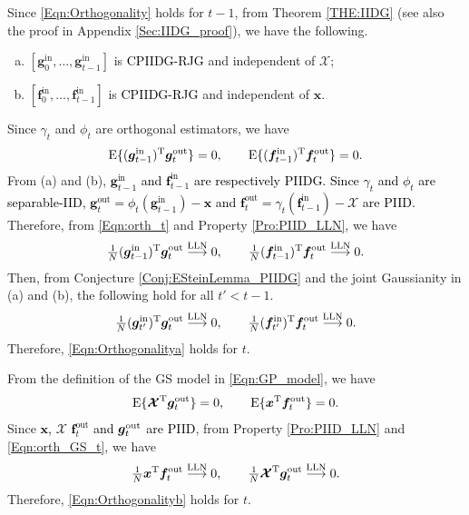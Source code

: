 \documentclass[journal]{IEEEtran}
\newcommand{\mr}{\mathrm}
\renewcommand{\bf}{\bm}
\newcommand{\LLC}[1]{\textcolor{black}{#1}}%
\begin{document}
        Since \eqref{Eqn:Orthogonality} holds for $t-1$, from Theorem \ref{THE:IIDG} (see also the proof in Appendix \ref{Sec:IIDG_proof}), we have the following.
    \begin{enumerate}[(a)] 
     \item  $\left[\bf{g}_0^{\mr{in}},\dots,\bf{g}_{t-1}^{\mr{in}}\right]$ is \LLC{CPIIDG-RJG} and independent of  $\bf{\mathcal{X}}$;
    \item   $\left[\bf{f}_0^{\mr{in}},\dots,\bf{f}_{t-1}^{\mr{in}}\right]$ is \LLC{CPIIDG-RJG} and independent of $\bf{x}$. 
\end{enumerate} 
    Since $\gamma_{t}$ and $\phi_{t}$ are orthogonal estimators, we have
    \begin{align}\label{Eqn:orth_t}
        {\rm E}\{(\bf{g}_{t-1}^{\rm in})^{\rm T}\bf{g}_t^{\rm out}\} =0,\qquad
          {\rm E}\{(\bf{f}_{t-1}^{\rm in})^{\rm T}\bf{f}_t^{\rm out}\} =0.
    \end{align}  
     From  (a) and (b), \LLC{$\bf{g}^{\mr{in}}_{t-1}$ and $\bf{f}^{\mr{in}}_{t-1}$ are respectively PIIDG. Since $\gamma_{t}$ and $\phi_{t}$ are separable-IID, $\bf{g}^{\mr{out}}_{t} = \phi_t(\bf{g}^{\mr{in}}_{t-1} )-\bf{x}$ and $\bf{f}^{\mr{out}}_{t} = \gamma_t(\bf{f}^{\mr{in}}_{t-1} )-\bf{\mathcal{X}}$ are PIID.} Therefore, from \eqref{Eqn:orth_t} and Property \ref{Pro:PIID_LLN}, we have
   \begin{align}\label{Eqn:t_1_orth_t}
        \tfrac{1}{N}(\bf{g}_{t-1}^{\rm in})^{\rm T}\bf{g}_t^{\rm out}    \overset{\rm LLN}{\longrightarrow}  {0},  \qquad 
        \tfrac{1}{N}(\bf{f}_{t-1}^{\rm in})^{\rm T}\bf{f}_t^{\rm out}  \overset{\rm LLN}{\longrightarrow}  {0}.
    \end{align} 
    Then, from Conjecture \ref{Conj:ESteinLemma_PIIDG} and the joint Gaussianity in (a) and (b), the following hold for all $t'<t-1$.   
     \begin{align} \label{Eqn:pre_orth_t}
        \tfrac{1}{N}(\bf{g}_{t'}^{\rm in})^{\rm T}\bf{g}_t^{\rm out}    \overset{\rm LLN}{\longrightarrow}  {0},   \qquad
        \tfrac{1}{N}(\bf{f}_{t'}^{\rm in})^{\rm T}\bf{f}_t^{\rm out}  \overset{\rm LLN}{\longrightarrow}  {0}.
    \end{align} 
    Therefore, \eqref{Eqn:Orthogonalitya} holds for $t$. 
    
    From the definition of the GS model in \eqref{Eqn:GP_model}, we have 
    \begin{align}\label{Eqn:orth_GS_t}
        {\rm E}\{\bf{\mathcal{X}}^{\rm T}\bf{g}_t^{\rm out}\} =0, \qquad
        {\rm E}\{\bf{x}^{\rm T}\bf{f}_t^{\rm out}\} =0.
    \end{align} 
    Since \LLC{$\bf{x}$, $\bf{\mathcal{X}}$ $\bf{f}^{\mr{out}}_{t}$ and $\bf{g}_t^{\rm out}$ are PIID}, from  Property \ref{Pro:PIID_LLN}  and \eqref{Eqn:orth_GS_t}, we have  
      \begin{align}
        \tfrac{1}{N}\bf{x}^{\rm T} \bf{f}^{\mr{out}}_{t}   \overset{\rm LLN}{\longrightarrow}  {0}, \qquad
        \tfrac{1}{N} \bf{\mathcal{X}}^{\rm T}\bf{g}_t^{\rm out}    
         \overset{\rm LLN}{\longrightarrow}  {0}.
    \end{align} 
    Therefore, \eqref{Eqn:Orthogonalityb} holds for $t$.
 
\end{document}

